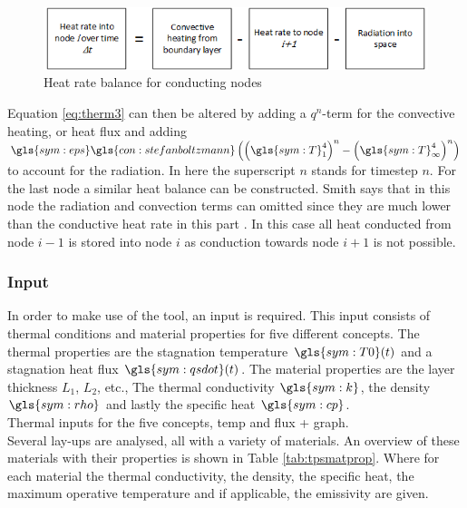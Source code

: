 \begin{figure}[H]
	\centering
	\includegraphics{Figure/thermblocknode2.png}
	\caption{Heat rate balance for conducting nodes}
	\label{fig:thermbalance2}
\end{figure}

Equation \eqref{eq:therm3} can then be altered by adding a $q^n$-term for the convective heating, or heat flux and adding  $\gls{sym:eps}\gls{con:stefanboltzmann}\left(\left(\gls{sym:T}_1^4\right)^n-\left(\gls{sym:T}_\infty^4\right)^n\right)$ to account for the radiation. In here the superscript $n$ stands for timestep $n$. For the last node a similar heat balance can be constructed. Smith says that in this node the radiation and convection terms can omitted since they are much lower than the conductive heat rate in this part \cite{Smith2011}. In this case all heat conducted from node $i-1$ is stored into node $i$ as conduction towards node $i+1$ is not possible.


\subsubsection{Input}
In order to make use of the tool, an input is required. This input consists of thermal conditions and material properties for five different concepts. The thermal properties are the stagnation temperature $ \gls{sym:T0}(t) $ and a stagnation heat flux $ \gls{sym:qsdot}(t) $. The material properties are the layer thickness $ L_1 $, $ L_2 $, etc., The thermal conductivity $ \gls{sym:k} $, the density $ \gls{sym:rho} $ and lastly the specific heat $ \gls{sym:cp} $.\\

Thermal inputs for the five concepts, temp and flux + graph.\\

Several lay-ups are analysed, all with a variety of materials. An overview of these materials with their properties is shown in Table  \ref{tab:tpsmatprop}. Where for each material the thermal conductivity, the density, the specific heat, the maximum operative temperature and if applicable, the emissivity are given.

